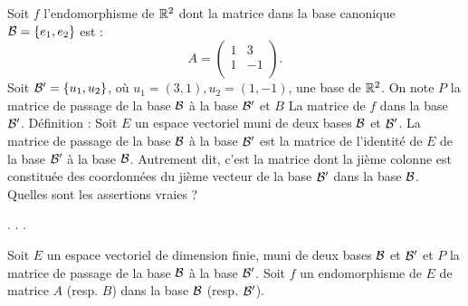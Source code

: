 \begin{question}
Soit $f$ l'endomorphisme de $\mathbb{R}^2$ dont la matrice dans la base canonique ${\cal B}=\{e_1,e_2\}$ est : 
$$A=\left(\begin{array}{rc}1&3\\
1&-1\\ \end{array}\right).$$
Soit ${\cal B}' = \{ u_1, u_2\}$, où  $u_1=(3,1), u_2=(1,-1)$, une base de $\mathbb{R}^2$. On note $P$ la matrice de passage de la base ${\cal B}$ à la base ${\cal B}'$ et $B$ La matrice de $f$ dans la base ${\cal B}'$.
\vskip1mm
Définition : Soit $E$ un espace vectoriel muni de deux bases ${\cal {B}}$ et ${\cal {B}}'$. La matrice de passage de la base ${\cal {B}}$ à la base  ${\cal {B}}'$ est la matrice de l'identité de $E$ de la base ${\cal {B}}'$ à la base  ${\cal {B}}$. Autrement dit, c'est la matrice dont la jième colonne est constituée des coordonnées du jième vecteur de la base ${\cal {B}'}$ dans la base  ${\cal {B}}$.
\vskip1mm
Quelles sont les assertions vraies ?
\begin{answers}  
.
.
.
\end{answers}
\begin{explanations} Soit $E$ un espace vectoriel de dimension finie, muni de deux bases ${\cal {B}}$ et ${\cal {B}}'$ 
et  $P$ la matrice de passage de la base ${\cal {B}}$ à la base ${\cal {B}}'$. Soit $f$ un endomorphisme de $E$ de matrice 
$A$ (resp. $B$) dans la base ${\cal {B}}$ (resp. ${\cal {B}}'$).  

\end{explanations}
\end{question}
